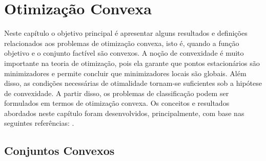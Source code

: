 \documentclass[12pt,a4paper]{scrartcl}
\def\RR{\mathds{R}}
\theoremstyle{definition}%
\newtheorem{defi}{Definição}
\begin{document}








\newpage

\section{Otimização Convexa}


Neste capítulo o objetivo principal é apresentar alguns resultados e definições relacionados aos problemas de otimização convexa, isto é, quando a função objetivo e o conjunto factível são convexos. A noção de convexidade é muito importante na teoria de otimização, pois ela garante que pontos estacionários são minimizadores e permite concluir que minimizadores locais são globais. Além disso, as condições necessárias de otimalidade tornam-se suficientes sob a hipótese de convexidade. A partir disso, os problemas de classificação podem ser formulados em termos de otimização convexa. Os conceitos e resultados abordados neste capítulo foram desenvolvidos, principalmente, com base nas seguintes referências: \textcite{Evelin2017,Ademir2013,Izmailov2014ac}.

\subsection{Conjuntos Convexos}
\end{document}
